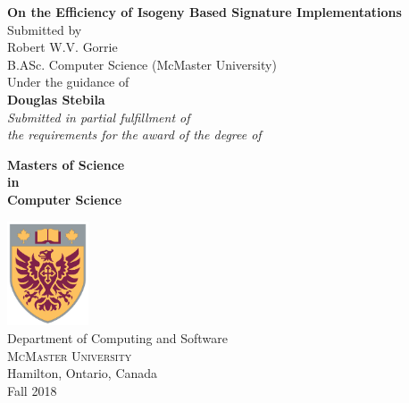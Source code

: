 \begin{titlepage}

\begin{center}
\Large \textbf {On the Efficiency of Isogeny Based Signature Implementations}\\[1in]

\normalsize Submitted by \\[0.25in]

Robert W.V. Gorrie \\
B.ASc. Computer Science (McMaster University)\\

\vspace{.6in}
Under the guidance of\\
{\textbf{Douglas Stebila}}\\[0.6in]

\small \emph{Submitted in partial fulfillment of\\
        the requirements for the award of the degree of}
        \vspace{.2in}

       {\bf Masters of Science \\in\\ Computer Science}\\[0.5in]

\vfill

\includegraphics[width=0.18\textwidth]{cresticon}\\[0.1in]
\Large{Department of Computing and Software}\\
\normalsize
\textsc{McMaster University}\\
Hamilton, Ontario, Canada\\
\vspace{0.2cm}
Fall 2018

\end{center}

\end{titlepage}
